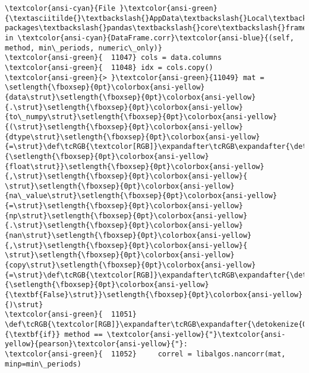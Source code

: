 \documentclass[11pt]{article}
\begin{document}
\begin{Verbatim}[commandchars=\\\{\}, frame=single, framerule=2mm, rulecolor=\color{outerrorbackground}]
\textcolor{ansi-cyan}{File }\textcolor{ansi-green}{\textasciitilde{}\textbackslash{}AppData\textbackslash{}Local\textbackslash{}Programs\textbackslash{}Python\textbackslash{}Python313\textbackslash{}Lib\textbackslash{}site-packages\textbackslash{}pandas\textbackslash{}core\textbackslash{}frame.py:11049}, in \textcolor{ansi-cyan}{DataFrame.corr}\textcolor{ansi-blue}{(self, method, min\_periods, numeric\_only)}
\textcolor{ansi-green}{  11047} cols = data.columns
\textcolor{ansi-green}{  11048} idx = cols.copy()
\textcolor{ansi-green}{> }\textcolor{ansi-green}{11049} mat = \setlength{\fboxsep}{0pt}\colorbox{ansi-yellow}{data\strut}\setlength{\fboxsep}{0pt}\colorbox{ansi-yellow}{.\strut}\setlength{\fboxsep}{0pt}\colorbox{ansi-yellow}{to\_numpy\strut}\setlength{\fboxsep}{0pt}\colorbox{ansi-yellow}{(\strut}\setlength{\fboxsep}{0pt}\colorbox{ansi-yellow}{dtype\strut}\setlength{\fboxsep}{0pt}\colorbox{ansi-yellow}{=\strut}\def\tcRGB{\textcolor[RGB]}\expandafter\tcRGB\expandafter{\detokenize{0,135,0}}{\setlength{\fboxsep}{0pt}\colorbox{ansi-yellow}{float\strut}}\setlength{\fboxsep}{0pt}\colorbox{ansi-yellow}{,\strut}\setlength{\fboxsep}{0pt}\colorbox{ansi-yellow}{ \strut}\setlength{\fboxsep}{0pt}\colorbox{ansi-yellow}{na\_value\strut}\setlength{\fboxsep}{0pt}\colorbox{ansi-yellow}{=\strut}\setlength{\fboxsep}{0pt}\colorbox{ansi-yellow}{np\strut}\setlength{\fboxsep}{0pt}\colorbox{ansi-yellow}{.\strut}\setlength{\fboxsep}{0pt}\colorbox{ansi-yellow}{nan\strut}\setlength{\fboxsep}{0pt}\colorbox{ansi-yellow}{,\strut}\setlength{\fboxsep}{0pt}\colorbox{ansi-yellow}{ \strut}\setlength{\fboxsep}{0pt}\colorbox{ansi-yellow}{copy\strut}\setlength{\fboxsep}{0pt}\colorbox{ansi-yellow}{=\strut}\def\tcRGB{\textcolor[RGB]}\expandafter\tcRGB\expandafter{\detokenize{0,135,0}}{\setlength{\fboxsep}{0pt}\colorbox{ansi-yellow}{\textbf{False}\strut}}\setlength{\fboxsep}{0pt}\colorbox{ansi-yellow}{)\strut}
\textcolor{ansi-green}{  11051} \def\tcRGB{\textcolor[RGB]}\expandafter\tcRGB\expandafter{\detokenize{0,135,0}}{\textbf{if}} method == \textcolor{ansi-yellow}{"}\textcolor{ansi-yellow}{pearson}\textcolor{ansi-yellow}{"}:
\textcolor{ansi-green}{  11052}     correl = libalgos.nancorr(mat, minp=min\_periods)


\end{Verbatim}
\end{document}
